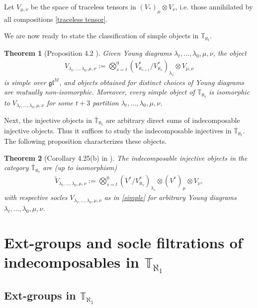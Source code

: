 \documentclass[openany, a4paper]{amsbook}
\newtheorem{thm}{Theorem}[chapter]
\theoremstyle{definition}
\numberwithin{equation}{chapter}
\newcommand{\Tbar}[1]{\overline{\mathbb{T}}_{\aleph_{#1}}}
\newcommand{\T}[1]{{\mathbb{T}}_{\aleph_{#1}}}
\begin{document}
Let $V_{\mu, \nu}$ be the space of traceless tensors in $(V_\ast)_\mu \otimes V_\nu$, i.e. those annihilated by all compositions \eqref{traceless tensor}. 

We are now ready to state the classification of simple objects in $\T{t}$. 
\begin{thm}[Proposition 4.2 \cite{cp17}]\label{simple theorem}
    Given Young diagrams $\lambda_t, ... , \lambda_0, \mu, \nu$, the object
    \begin{align}\label{simple}
        V_{\lambda_t, ... , \lambda_0, \mu, \nu} := \bigotimes_{s=t}^{0} (V^{\ast}_{\aleph_{s+1}}/V^{\ast}_{\aleph_{s}})_{\lambda_s} \otimes V_{\mu, \nu}
    \end{align}
is simple over $\mathfrak{gl}^M$, and objects obtained for distinct choices of Young diagrams are
mutually non-isomorphic. Moreover, every simple object of $\T{t}$ is isomorphic to $V_{\lambda_t, ... , \lambda_0, \mu, \nu}$ for some $t+3$ partition $\lambda_t, ..., \lambda_0, \mu, \nu$.
\end{thm}

Next, the injective objects in $\Tbar{t}$ are arbitrary direct sums of indecomposable injective objects. Thus it suffices to study the indecomposable injectives in $\Tbar{t}$. The following proposition characterizes these objects.
\begin{thm}[Corollary 4.25(b) in \cite{cp17}]\label{indecomposable theorem}
    The indecomposable injective objects in the category $\Tbar{t}$ are (up to isomorphism)
    \begin{align}\label{indecomposable injective}
        \tilde{V}_{\lambda_t, ... , \lambda_0, \mu, \nu} := \bigotimes_{s=t}^{0} (V^{\ast}/V^{\ast}_{\aleph_{s}})_{\lambda_s} \otimes (V^*)_\mu \otimes V_\nu,
    \end{align}
    with respective socles $V_{\lambda_t, ... , \lambda_0, \mu, \nu}$ as in \ref{simple} for arbitrary Young diagrams $\lambda_t, ... , \lambda_0, \mu, \nu$.
\end{thm}

\chapter{Ext-groups and socle filtrations of indecomposables in \texorpdfstring{$\T{1}$}{T 1}}

\section{Ext-groups in \texorpdfstring{$\T{1}$}{T 1}}
\end{document}
